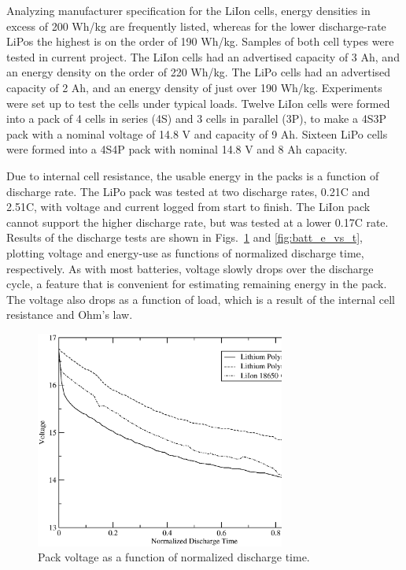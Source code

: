 \documentclass{ifacconf}
\begin{document}
Analyzing manufacturer specification for the LiIon cells, energy densities in excess of 200 Wh/kg are frequently listed, whereas for the lower discharge-rate LiPos the highest is on the order of 190 Wh/kg. Samples of both cell types were tested in current project. The LiIon cells had an advertised capacity of 3 Ah, and an energy density on the order of 220 Wh/kg. The LiPo cells had an advertised capacity of 2 Ah, and an energy density of just over 190 Wh/kg. Experiments were set up to test the cells under typical loads. Twelve LiIon cells were formed into a pack of 4 cells in series (4S) and 3 cells in parallel (3P), to make a 4S3P pack with a nominal voltage of 14.8 V and capacity of 9 Ah. Sixteen LiPo cells were formed into a 4S4P pack with nominal 14.8 V and 8 Ah capacity.

Due to internal cell resistance, the usable energy in the packs is a function of discharge rate. The LiPo pack was tested at two discharge rates, 0.21C and 2.51C, with voltage and current logged from start to finish. The LiIon pack cannot support the higher discharge rate, but was tested at a lower 0.17C rate. Results of the discharge tests are shown in Figs.~\ref{fig:batt_v_vs_t} and \ref{fig:batt_e_vs_t}, plotting voltage and energy-use as functions of normalized discharge time, respectively. As with most batteries, voltage slowly drops over the discharge cycle, a feature that is convenient for estimating remaining energy in the pack. The voltage also drops as a function of load, which is a result of the internal cell resistance and Ohm's law.

\begin{figure}
  \centering
  \includegraphics[width=82mm]{Figures/V_versus_T.eps}
  \caption{Pack voltage as a function of normalized discharge time.}
  \label{fig:batt_v_vs_t}
\end{figure}
\end{document}
